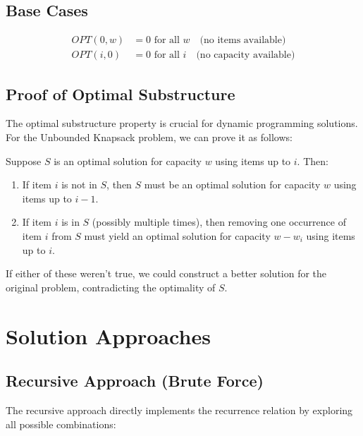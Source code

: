 \documentclass{article}
\begin{document}
\subsection{Base Cases}
\begin{align}
OPT(0, w) &= 0 \text{ for all } w \quad \text{(no items available)}\\
OPT(i, 0) &= 0 \text{ for all } i \quad \text{(no capacity available)}
\end{align}

\subsection{Proof of Optimal Substructure}

The optimal substructure property is crucial for dynamic programming solutions. For the Unbounded Knapsack problem, we can prove it as follows:

\begin{tcolorbox}[theorembox, title=Optimal Substructure Proof]
Suppose $S$ is an optimal solution for capacity $w$ using items up to $i$. Then:

\begin{enumerate}
    \item If item $i$ is not in $S$, then $S$ must be an optimal solution for capacity $w$ using items up to $i-1$.
    
    \item If item $i$ is in $S$ (possibly multiple times), then removing one occurrence of item $i$ from $S$ must yield an optimal solution for capacity $w-w_i$ using items up to $i$.
\end{enumerate}

If either of these weren't true, we could construct a better solution for the original problem, contradicting the optimality of $S$.
\end{tcolorbox}

\section{Solution Approaches}

\subsection{Recursive Approach (Brute Force)}

The recursive approach directly implements the recurrence relation by exploring all possible combinations:
\end{document}
